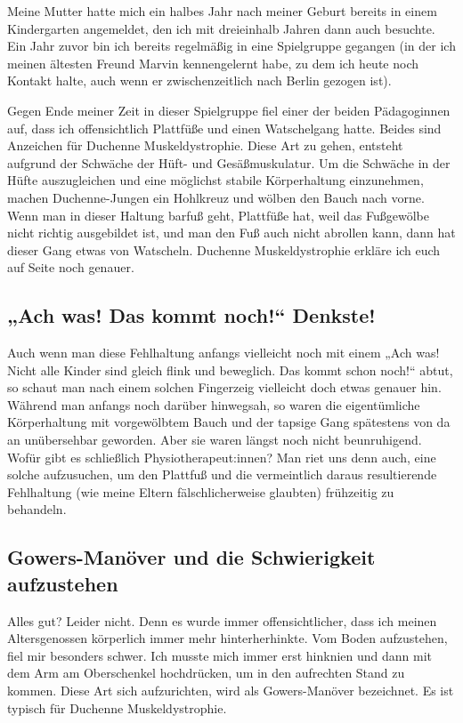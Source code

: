 \documentclass[fontsize=14pt,a4paper,headinclude,DIV=calc,automark]{scrbook}
\begin{document}
Meine Mutter hatte mich ein halbes Jahr nach meiner Geburt bereits in einem Kindergarten angemeldet, den ich mit dreieinhalb Jahren dann auch besuchte. Ein Jahr zuvor bin ich bereits regelmäßig in eine Spielgruppe gegangen (in der ich meinen ältesten Freund Marvin kennengelernt habe, zu dem ich heute noch Kontakt halte, auch wenn er zwischenzeitlich nach Berlin gezogen ist).

Gegen Ende meiner Zeit in dieser Spielgruppe fiel einer der beiden Pädagoginnen auf, dass ich offensichtlich Plattfüße und einen Watschelgang hatte. Beides sind Anzeichen für Duchenne Muskeldystrophie. Diese Art zu gehen, entsteht aufgrund der Schwäche der Hüft- und Gesäßmuskulatur. Um die Schwäche in der Hüfte auszugleichen und eine möglichst stabile Körperhaltung einzunehmen, machen Duchenne-Jungen ein Hohlkreuz und wölben den Bauch nach vorne. Wenn man in dieser Haltung barfuß geht, Plattfüße hat, weil das Fußgewölbe nicht richtig ausgebildet ist, und man den Fuß auch nicht abrollen kann, dann hat dieser Gang etwas von Watscheln. Duchenne Muskeldystrophie erkläre ich euch auf Seite \pageref{sec:muskeldystrophie} noch genauer.

\subsection{„Ach was! Das kommt noch!“ Denkste!}

Auch wenn man diese Fehlhaltung anfangs vielleicht noch mit einem „Ach was! Nicht alle Kinder sind gleich flink und beweglich. Das kommt schon noch!“ abtut, so schaut man nach einem solchen Fingerzeig vielleicht doch etwas genauer hin. Während man anfangs noch darüber hinwegsah, so waren die eigentümliche Körperhaltung mit vorgewölbtem Bauch und der tapsige Gang spätestens von da an unübersehbar geworden. Aber sie waren längst noch nicht beunruhigend. Wofür gibt es schließlich Phy\-sio\-the\-ra\-peu\-t:in\-nen? Man riet uns denn auch, eine solche aufzusuchen, um den Plattfuß und die vermeintlich daraus resultierende Fehlhaltung (wie meine Eltern fälschlicherweise glaubten) frühzeitig zu behandeln.
              
\subsection{Gowers-Manöver und die Schwierigkeit aufzustehen}

Alles gut? Leider nicht. Denn es wurde immer offensichtlicher, dass ich meinen Altersgenossen körperlich immer mehr hinterherhinkte. Vom Boden aufzustehen, fiel mir besonders schwer. Ich musste mich immer erst hinknien und dann mit dem Arm am Oberschenkel hochdrücken, um in den aufrechten Stand zu kommen. Diese Art sich aufzurichten, wird als Gowers-Manöver bezeichnet. Es ist typisch für Duchenne Muskeldystrophie.
\end{document}
